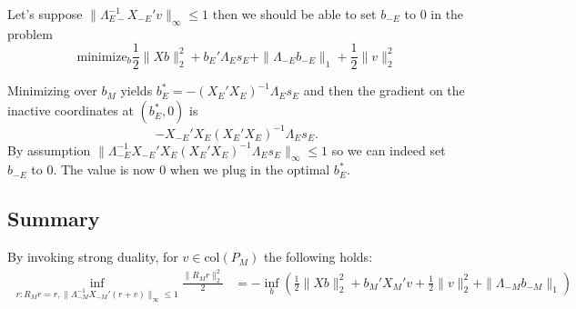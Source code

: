 \documentclass{article}
\begin{document}
          Let's suppose $\|\Lambda_{E-}^{-1}X_{-E}'v\|_{\infty} \leq 1$ then we should be able to set $b_{-E}$ to 0 in the problem
          $$
          \text{minimize}_b \frac{1}{2} \|Xb\|^2_2 + b_E'\Lambda_Es_E + \|\Lambda_{-E}b_{-E}\|_1 + \frac{1}{2} \|v\|^2_2
          $$

          Minimizing over $b_M$ yields $b_E^* =-(X_E'X_E)^{-1}\Lambda_Es_E$ and then the gradient
          on the inactive coordinates at $(b_E^*, 0)$ is
          $$
          -X_{-E}'X_E(X_E'X_E)^{-1}\Lambda_Es_E.
          $$
          By assumption $\|\Lambda_{-E}^{-1}X_{-E}'X_E(X_E'X_E)^{-1}\Lambda_Es_E\|_{\infty} \leq 1$ so we can indeed set $b_{-E}$ to 0.
          The value is now 0 when we plug in the optimal $b_E^*$.

          \subsection{Summary}

          By invoking strong duality, for $v \in \text{col}(P_M)$ the following holds:
          $$
          \begin{aligned}
          \inf_{r: R_Mr=r,  \|\Lambda_{-M}^{-1}X_{-M}'(r + v)\|_{\infty}
            \leq 1} \frac{\|R_Mr\|^2_2}{2} &= -\inf_b \left(\frac{1}{2} \|Xb\|^2_2 + b_M'X_M'v + \frac{1}{2} \|v\|^2_2  + \|\Lambda_{-M}b_{-M}\|_1\right)\\
          \end{aligned}
          $$
          
          
\end{document}
